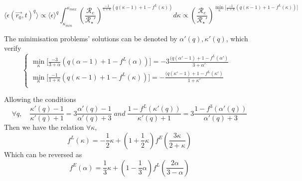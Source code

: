 \begin{fullwidth}\begin{equation}
    \displaystyle \langle\epsilon(\vec{r_0},t)^q\rangle\propto\langle\epsilon\rangle^q\int_{\kappa_{min}}^{\kappa_{max}}\left(\frac{\mathcal{R}_e}{\mathcal{R}_\star'}\right)^{\frac{-1}{1+\kappa}\left(q(\kappa-1)+1-f^L(\kappa)\right)}d\kappa\propto\left(\frac{\mathcal{R}_e}{\mathcal{R}_\star'}\right)^{\min_\kappa\bigg[\frac{-1}{1+\kappa}\left(q(\kappa-1)+1-f^L(\kappa)\right)\bigg]}
\end{equation}\end{fullwidth}

The minimisation problems' solutions can be denoted by $\alpha'(q),\kappa'(q)$, which verify
\begin{equation}
    \begin{cases}
    \displaystyle\min_\kappa\bigg[\frac{-3}{3+\alpha}\left(q(\alpha-1)+1-f^L(\alpha)\right)\bigg]=-3\frac{(q(\alpha'-1)+1-f^L(\alpha')}{3+\alpha'}&\\
    \displaystyle\min_\kappa\bigg[\frac{-1}{1+\kappa}\left(q(\kappa-1)+1-f^L(\kappa)\right)\bigg]=-\frac{(q(\kappa'-1)+1-f^L(\kappa')}{1+\kappa'}&\\
    \end{cases}
\end{equation}

Allowing the conditions 
\begin{equation}
    \forall q,\quad\frac{\kappa'(q)-1}{\kappa'(q)+1}=3\frac{\alpha'(q)-1}{\alpha'(q)+3}\;and\;\frac{1-f^L(\kappa'(q))}{\kappa'(q)+1}=3\frac{1-f^3(\alpha'(q))}{\alpha'(q)+3}
\end{equation}
Then we have the relation $\forall \kappa$,
\begin{equation}
    f^L(\kappa)=-\frac{1}{2}\kappa+\left(1+\frac{1}{2}\kappa\right)f^E\left(\frac{3\kappa}{2+\kappa}\right)
\end{equation}
Which can be reversed as 
\begin{equation}
    f^E(\alpha)=\frac{1}{3}\kappa+\left(1-\frac{1}{3}\alpha\right)f^L\left(\frac{2\alpha}{3-\alpha}\right)
\end{equation}

